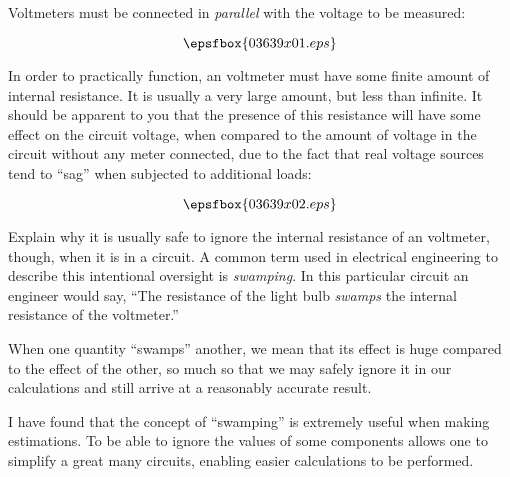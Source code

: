 

Voltmeters must be connected in {\it parallel} with the voltage to be measured:

$$\epsfbox{03639x01.eps}$$

In order to practically function, an voltmeter must have some finite amount of internal resistance.  It is usually a very large amount, but less than infinite.  It should be apparent to you that the presence of this resistance will have some effect on the circuit voltage, when compared to the amount of voltage in the circuit without any meter connected, due to the fact that real voltage sources tend to ``sag'' when subjected to additional loads:

$$\epsfbox{03639x02.eps}$$

Explain why it is usually safe to ignore the internal resistance of an voltmeter, though, when it is in a circuit.  A common term used in electrical engineering to describe this intentional oversight is {\it swamping}.  In this particular circuit an engineer would say, ``The resistance of the light bulb {\it swamps} the internal resistance of the voltmeter.''







When one quantity ``swamps'' another, we mean that its effect is huge compared to the effect of the other, so much so that we may safely ignore it in our calculations and still arrive at a reasonably accurate result.







I have found that the concept of ``swamping'' is extremely useful when making estimations.  To be able to ignore the values of some components allows one to simplify a great many circuits, enabling easier calculations to be performed. 




